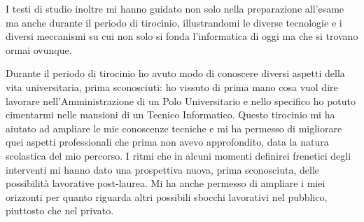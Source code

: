         I testi di studio inoltre mi hanno guidato non solo nella preparazione all'esame ma anche durante il periodo di tirocinio, illustrandomi le diverse tecnologie e i diversi meccanismi su cui non solo si fonda l'informatica di oggi ma che si trovano ormai ovunque.
        \par
            Durante il periodo di tirocinio ho avuto modo di conoscere diversi aspetti della vita universitaria, prima sconosciuti: ho vissuto di prima mano cosa vuol dire lavorare nell'Amministrazione di un Polo Universitario e nello specifico ho potuto cimentarmi nelle mansioni di un Tecnico Informatico. \newline
            Questo tirocinio mi ha aiutato ad ampliare le mie conoscenze tecniche e mi ha permesso di migliorare quei aspetti professionali che prima non avevo approfondito, data la natura scolastica del mio percorso. I ritmi che in alcuni momenti definirei frenetici degli interventi mi hanno dato una prospettiva nuova, prima sconosciuta, delle possibilità lavorative post-laurea. Mi ha anche permesso di ampliare i miei orizzonti per quanto riguarda altri possibili sbocchi lavorativi nel pubblico, piuttosto che nel privato. 
